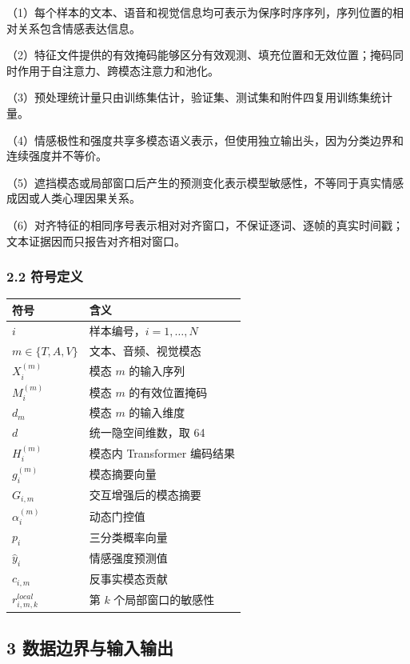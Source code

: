 \documentclass[
  12pt,
  a4paper,
]{ctexart}
\begin{document}
（1）每个样本的文本、语音和视觉信息均可表示为保序时序序列，序列位置的相对关系包含情感表达信息。

（2）特征文件提供的有效掩码能够区分有效观测、填充位置和无效位置；掩码同时作用于自注意力、跨模态注意力和池化。

（3）预处理统计量只由训练集估计，验证集、测试集和附件四复用训练集统计量。

（4）情感极性和强度共享多模态语义表示，但使用独立输出头，因为分类边界和连续强度并不等价。

（5）遮挡模态或局部窗口后产生的预测变化表示模型敏感性，不等同于真实情感成因或人类心理因果关系。

（6）对齐特征的相同序号表示相对对齐窗口，不保证逐词、逐帧的真实时间戳；文本证据因而只报告对齐相对窗口。

\hypertarget{ux7b26ux53f7ux5b9aux4e49}{%
\subsubsection{2.2 符号定义}\label{ux7b26ux53f7ux5b9aux4e49}}

\begin{longtable}[]{@{}ll@{}}
\toprule
符号 & 含义 \\
\midrule
\endhead
\(i\) & 样本编号，\(i=1,\ldots,N\) \\
\(m\in\{T,A,V\}\) & 文本、音频、视觉模态 \\
\(X_i^{(m)}\) & 模态 \(m\) 的输入序列 \\
\(M_i^{(m)}\) & 模态 \(m\) 的有效位置掩码 \\
\(d_m\) & 模态 \(m\) 的输入维度 \\
\(d\) & 统一隐空间维数，取 64 \\
\(H_i^{(m)}\) & 模态内 Transformer 编码结果 \\
\(g_i^{(m)}\) & 模态摘要向量 \\
\(G_{i,m}\) & 交互增强后的模态摘要 \\
\(\alpha_i^{(m)}\) & 动态门控值 \\
\(p_i\) & 三分类概率向量 \\
\(\hat y_i\) & 情感强度预测值 \\
\(c_{i,m}\) & 反事实模态贡献 \\
\(r_{i,m,k}^{local}\) & 第 \(k\) 个局部窗口的敏感性 \\
\bottomrule
\end{longtable}

\hypertarget{ux6570ux636eux8fb9ux754cux4e0eux8f93ux5165ux8f93ux51fa}{%
\subsection{3
数据边界与输入输出}\label{ux6570ux636eux8fb9ux754cux4e0eux8f93ux5165ux8f93ux51fa}}
\end{document}
